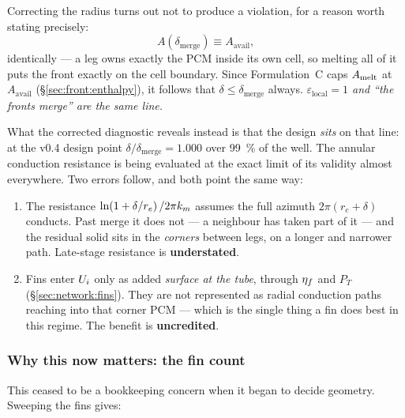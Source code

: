 Correcting the radius turns out not to produce a violation, for a reason worth
stating precisely:
\begin{equation}
  A\!\left(\delta_{\mathrm{merge}}\right) \equiv A_{\mathrm{avail}},
\end{equation}
identically --- a leg owns exactly the PCM inside its own cell, so melting all
of it puts the front exactly on the cell boundary. Since Formulation~C caps
$A_{\mathrm{melt}}$ at $A_{\mathrm{avail}}$ (\S\ref{sec:front:enthalpy}), it follows that
$\delta \le \delta_{\mathrm{merge}}$ always. \emph{$\varepsilon_{\mathrm{local}}=1$
and ``the fronts merge'' are the same line.}

What the corrected diagnostic reveals instead is that the design \emph{sits} on
that line: at the v0.4 design point $\delta/\delta_{\mathrm{merge}}=1.000$ over
\SI{99}{\percent} of the well. The annular conduction resistance is being
evaluated at the exact limit of its validity almost everywhere. Two errors
follow, and both point the same way:

\begin{enumerate}[leftmargin=1.7em,itemsep=3pt]
\item The resistance $\ln\!\left(1+\delta/r_{e}\right)/2\pi k_{m}$ assumes the full
  azimuth $2\pi\left(r_{e}+\delta\right)$ conducts. Past merge it does not --- a
  neighbour has taken part of it --- and the residual solid sits in the
  \emph{corners} between legs, on a longer and narrower path. Late-stage
  resistance is \textbf{understated}.
\item Fins enter $U_{i}$ only as added \emph{surface at the tube}, through
  $\eta_{f}$ and $P_{T}$ (\S\ref{sec:network:fins}). They are not represented as
  radial conduction paths
  reaching into that corner PCM --- which is the single thing a fin does best in
  this regime. The benefit is \textbf{uncredited}.
\end{enumerate}

\subsubsection*{Why this now matters: the fin count}

This ceased to be a bookkeeping concern when it began to decide geometry.
Sweeping the fins gives:

